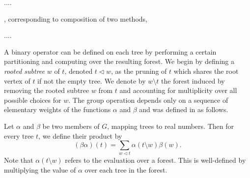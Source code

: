 ....

, corresponding to composition of two methods,

....

A binary operator can be defined on each tree by performing a certain partitioning and computing over the resulting forest.  We begin by defining a \emph{rooted subtree} $w$ of $t$, denoted $t \lhd w$, as the pruning of $t$ which shares the root vertex of $t$ if not the empty tree.  We denote by $w \setminus t$ the forest induced by removing the rooted subtree $w$ from $t$ and accounting for multiplicity over all possible choices for $w$. %
The group operation depends only on a sequence of elementary weights of the functions $\alpha$ and $\beta$ and was defined in \cite{Butcher2008_book} as follows.
\begin{definition}\label{def:Group_operation}
	Let $\alpha$ and $\beta$ be two members of $G$, mapping trees to real numbers. Then for every tree $t$, we define their product by
	\begin{equation}\label{eq:Group_operation}
		(\beta\alpha)(t) = \sum_{w \lhd t}\alpha(t \setminus w)\beta(w).
	\end{equation}
	Note that $\alpha(t \setminus w)$ refers to the evaluation over a forest. This is well-defined by multiplying the value of $\alpha$ over each tree in the forest.
\end{definition}
